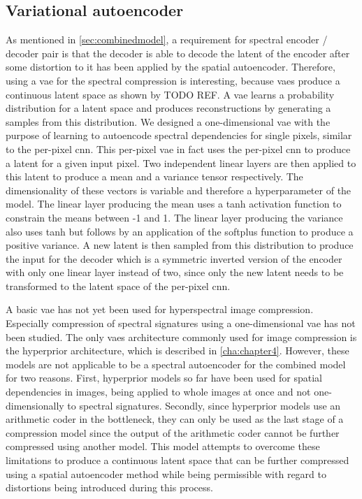 \subsection{Variational autoencoder \label{sec:vae}}
As mentioned in \autoref{sec:combinedmodel}, a requirement for spectral encoder / decoder pair is that the decoder is able to decode the latent of the encoder after some distortion to it has been applied by the spatial autoencoder. Therefore, using a \ac{vae} for the spectral compression is interesting, because \acp{vae} produce a continuous latent space as shown by TODO REF. A \ac{vae} learns a probability distribution for a latent space and produces reconstructions by generating a samples from this distribution. We designed a one-dimensional \ac{vae} with the purpose of learning to autoencode spectral dependencies for single pixels, similar to the per-pixel \ac{cnn}. This per-pixel \ac{vae} in fact uses the per-pixel \ac{cnn} to produce a latent for a given input pixel. Two independent linear layers are then applied to this latent to produce a mean and a variance tensor respectively. The dimensionality of these vectors is variable and therefore a hyperparameter of the model. The linear layer producing the mean uses a tanh activation function to constrain the means between -1 and 1. The linear layer producing the variance also uses tanh but follows by an application of the softplus function to produce a positive variance. A new latent is then sampled from this distribution to produce the input for the decoder which is a symmetric inverted version of the encoder with only one linear layer instead of two, since only the new latent needs to be transformed to the latent space of the per-pixel \ac{cnn}.

A basic \ac{vae} has not yet been used for hyperspectral image compression. Especially compression of spectral signatures using a one-dimensional \ac{vae} has not been studied. The only \acp{vae} architecture commonly used for image compression is the hyperprior architecture, which is described in \autoref{cha:chapter4}. However, these models are not applicable to be a spectral autoencoder for the combined model for two reasons. First, hyperprior models so far have been used for spatial dependencies in images, being applied to whole images at once and not one-dimensionally to spectral signatures. Secondly, since hyperprior models use an arithmetic coder in the bottleneck, they can only be used as the last stage of a compression model since the output of the arithmetic coder cannot be further compressed using another model. This model attempts to overcome these limitations to produce a continuous latent space that can be further compressed using a spatial autoencoder method while being permissible with regard to distortions being introduced during this process.
